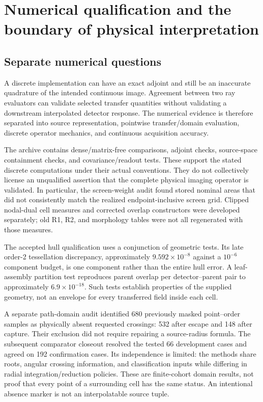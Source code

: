 \section{Numerical qualification and the boundary of physical interpretation}\label{sec:validation}
\subsection{Separate numerical questions}
A discrete implementation can have an exact adjoint and still be an inaccurate quadrature of the intended continuous image. Agreement between two ray evaluators can validate selected transfer quantities without validating a downstream interpolated detector response. The numerical evidence is therefore separated into source representation, pointwise transfer/domain evaluation, discrete operator mechanics, and continuous acquisition accuracy.

The archive contains dense/matrix-free comparisons, adjoint checks, source-space containment checks, and covariance/readout tests. These support the stated discrete computations under their actual conventions. They do not collectively license an unqualified assertion that the complete physical imaging operator is validated. In particular, the screen-weight audit found stored nominal areas that did not consistently match the realized endpoint-inclusive screen grid. Clipped nodal-dual cell measures and corrected overlap constructors were developed separately; old R1, R2, and morphology tables were not all regenerated with those measures.

The accepted hull qualification uses a conjunction of geometric tests. Its late order-2 tessellation discrepancy, approximately $9.592\times10^{-8}$ against a $10^{-6}$ component budget, is one component rather than the entire hull error. A leaf-assembly partition test reproduces parent overlap per detector--parent pair to approximately $6.9\times10^{-18}$. Such tests establish properties of the supplied geometry, not an envelope for every transferred field inside each cell.

A separate path-domain audit identified 680 previously masked point--order samples as physically absent requested crossings: 532 after escape and 148 after capture. Their exclusion did not require repairing a source-radius formula. The subsequent comparator closeout resolved the tested 66 development cases and agreed on 192 confirmation cases. Its independence is limited: the methods share roots, angular crossing information, and classification inputs while differing in radial integration/reduction policies. These are finite-cohort domain results, not proof that every point of a surrounding cell has the same status. An intentional absence marker is not an interpolatable source tuple.


